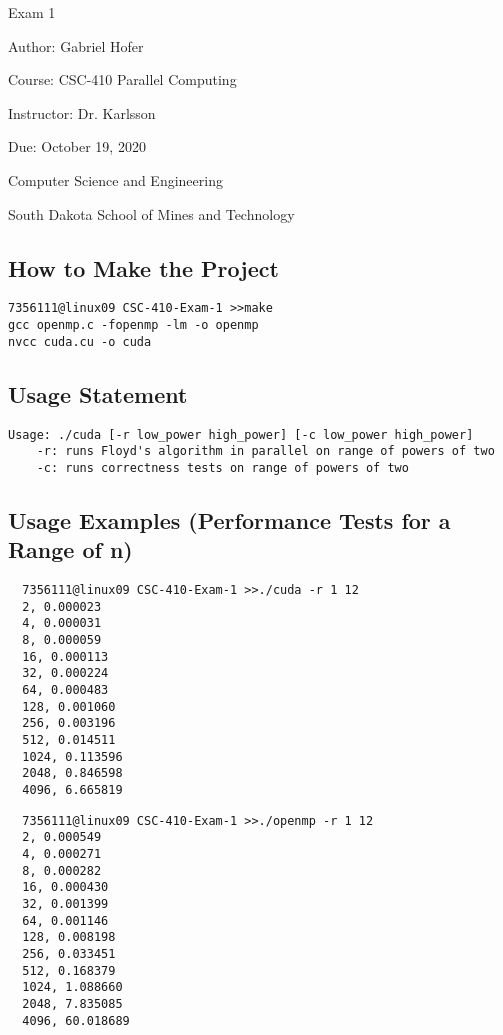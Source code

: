 \documentclass[12pt]{article}
\begin{document}
\begin{titlepage}
   \begin{center}
       \vspace*{1cm}
       \Large
       Exam 1
       \normalsize

       \vspace{0.5cm}

       Author: Gabriel Hofer

       \vspace{0.5cm}

       Course: CSC-410 Parallel Computing

       \vspace{0.5cm}

       Instructor: Dr. Karlsson
       \vspace{0.5cm}

       Due: October 19, 2020

       \vfill

       Computer Science and Engineering\

       South Dakota School of Mines and Technology\
   \end{center}
\end{titlepage}
\newpage
\subsection*{How to Make the Project}
\begin{verbatim}
7356111@linux09 CSC-410-Exam-1 >>make
gcc openmp.c -fopenmp -lm -o openmp
nvcc cuda.cu -o cuda
\end{verbatim}
\subsection*{Usage Statement}
\begin{verbatim}
Usage: ./cuda [-r low_power high_power] [-c low_power high_power]
	-r: runs Floyd's algorithm in parallel on range of powers of two
	-c: runs correctness tests on range of powers of two
\end{verbatim}
\subsection*{Usage Examples (Performance Tests for a Range of n)}
\begin{verbatim}
  7356111@linux09 CSC-410-Exam-1 >>./cuda -r 1 12
  2, 0.000023
  4, 0.000031
  8, 0.000059
  16, 0.000113
  32, 0.000224
  64, 0.000483
  128, 0.001060
  256, 0.003196
  512, 0.014511
  1024, 0.113596
  2048, 0.846598
  4096, 6.665819
\end{verbatim}
\begin{verbatim}
  7356111@linux09 CSC-410-Exam-1 >>./openmp -r 1 12
  2, 0.000549
  4, 0.000271
  8, 0.000282
  16, 0.000430
  32, 0.001399
  64, 0.001146
  128, 0.008198
  256, 0.033451
  512, 0.168379
  1024, 1.088660
  2048, 7.835085
  4096, 60.018689
\end{verbatim}
\end{document}
